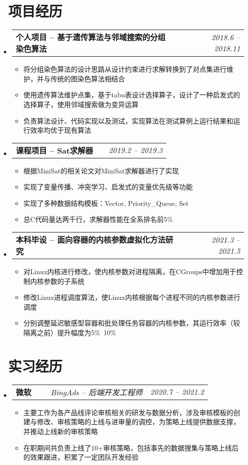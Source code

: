 \documentclass[utf8,letterpaper,11pt]{ctexart}
\makeatletter
\newcommand{\resumeOneItem}[1]{
  \item\small{
    {#1 \vspace{-2pt}}
  }
}
\newcommand{\resumeSubheading}[4]{
  \vspace{-1pt}\item
    \begin{tabular*}{0.97\textwidth}[t]{l@{\extracolsep{\fill}}r}
      \textbf{#1} & \textit{#2} \\
      \textit{\small#3} & \textit{\small #4} \\
    \end{tabular*}\vspace{-5pt}
}
\newcommand{\resumeTwoItemHeading}[2]{
  \vspace{-1pt}\item
    \begin{tabular*}{0.97\textwidth}{l@{\extracolsep{\fill}}r}
      \textbf{#1} & \textit{\small #2} \\
    \end{tabular*}\vspace{-5pt}
}
\newcommand{\resumeThreeItemHeading}[3]{
  \vspace{-1pt}\item
    \begin{tabular*}{0.97\textwidth}{ll@{\extracolsep{\fill}}r}
      \textbf{#1}\ \ \ &  \textit{\small#2} & \textit{\small #3} \\
    \end{tabular*}\vspace{-5pt}
}
\newcommand{\resumeSubHeadingListStart}{\begin{itemize}[leftmargin=*]}
\newcommand{\resumeSubHeadingListEnd}{\end{itemize}}
\newcommand{\resumeItemListStart}{\begin{itemize}}
\newcommand{\resumeItemListEnd}{\end{itemize}\vspace{-5pt}}
\makeatother
\begin{document}
\section{\faLayerGroup \ 项目经历}
\resumeSubHeadingListStart
  \resumeTwoItemHeading{个人项目 -- 基于遗传算法与邻域搜索的分组染色算法}{\href{https://github.com/copyrightpoiiiii/Hybrid-Evolutionary-Algorithms-for-the-Partition-Coloring-Problem}{\faGithub*}\ \ 2018.6 -- 2018.11}
    \resumeItemListStart
          \resumeOneItem{将分组染色算法的设计思路从设计约束进行求解转换到了对点集进行维护，并与传统的图染色算法相结合}
          \resumeOneItem{使用遗传算法维护点集，基于tabu表设计选择算子，设计了一种启发式的选择算子，使用邻域搜索做为变异运算}
          \resumeOneItem{负责算法设计、代码实现以及测试，实现算法在测试算例上运行结果和运行效率均优于现有算法}
    \resumeItemListEnd
  \resumeTwoItemHeading{课程项目 -- Sat求解器}{\href{https://github.com/copyrightpoiiiii/Sat-and-Sudoku-Solver}{\faGithub*}\ \ 2019.2 -- 2019.3}
    \resumeItemListStart
          \resumeOneItem{根据MiniSat的相关论文对MiniSat求解器进行了实现}
          \resumeOneItem{实现了变量传播、冲突学习、启发式的变量优先级等功能}
          \resumeOneItem{实现了多种数据结构模板：Vector, Priority\_Queue, Set}
          \resumeOneItem{总C代码量达两千行，求解器性能在全系排名前5\%}
    \resumeItemListEnd
     \resumeTwoItemHeading{本科毕设 -- 面向容器的内核参数虚拟化方法研究}{2021.3 -- 2021.5}
     \resumeItemListStart
           \resumeOneItem{对Linux内核进行修改，使内核参数对进程隔离，在CGroups中增加用于控制内核参数的子系统}
           \resumeOneItem{修改Linux进程调度算法，使Linux内核根据每个进程不同的内核参数进行调度}
           \resumeOneItem{分别调整延迟敏感型容器和批处理任务容器的内核参数，其运行效率（较隔离之前）提升幅度为5\%~10\%}
     \resumeItemListEnd
\resumeSubHeadingListEnd
\vspace{1pt}
\section{\faBriefcase \ 实习经历}
  \resumeSubHeadingListStart
    \resumeThreeItemHeading{微软}{BingAds -- 后端开发工程师}{2020.7 -- 2021.2}
        \resumeItemListStart
        \resumeOneItem{主要工作为各产品线评论审核相关的研发与数据分析，涉及审核模板的创建与修改、审核策略的上线与进审量的调控，为策略上线提供数据支撑，并推动上线新的审核策略}
        \resumeOneItem{在职期间共负责上线了10+审核策略，包括事先的数据搜集与策略上线后的效果跟进，积累了一定团队开发经验}
        \resumeItemListEnd
  \resumeSubHeadingListEnd
\vspace{1pt}
\end{document}
